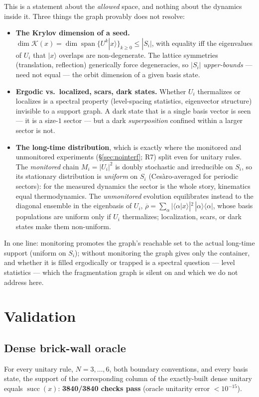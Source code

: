 \documentclass[11pt]{article}
\begin{document}
This is a statement about the \emph{allowed} space, and nothing about the dynamics
inside it. Three things the graph provably does not resolve:
\begin{itemize}\itemsep2pt
  \item \textbf{The Krylov dimension of a seed.}
  $\dim\mathcal K(x)=\dim\operatorname{span}\{U^k|x\rangle\}_{k\ge0}\le|S_i|$,
  with equality iff the eigenvalues of $U_i$ that $|x\rangle$ overlaps are
  non-degenerate. The lattice symmetries (translation, reflection) generically
  force degeneracies, so $|S_i|$ \emph{upper-bounds} --- need not equal --- the
  orbit dimension of a given basis state.
  \item \textbf{Ergodic vs.\ localized, scars, dark states.} Whether $U_i$
  thermalizes or localizes is a spectral property (level-spacing statistics,
  eigenvector structure) invisible to a support graph. A dark state that is a
  single basis vector is seen --- it is a size-$1$ sector --- but a dark
  \emph{superposition} confined within a larger sector is not.
  \item \textbf{The long-time distribution}, which is exactly where the monitored
  and unmonitored experiments (\S\ref{sec:nointerf}; R7) split even for unitary
  rules. The \emph{monitored} chain $M_i=|U_i|^2$ is doubly stochastic and
  irreducible on $S_i$, so its stationary distribution is \emph{uniform} on $S_i$
  (Ces\`aro-averaged for periodic sectors): for the measured dynamics the sector
  is the whole story, kinematics equal thermodynamics. The \emph{unmonitored}
  evolution equilibrates instead to the diagonal ensemble in the eigenbasis of
  $U_i$, $\overline\rho=\sum_\alpha|\langle\alpha|x\rangle|^2\,|\alpha\rangle\!
  \langle\alpha|$, whose basis populations are uniform only if $U_i$ thermalizes;
  localization, scars, or dark states make them non-uniform.
\end{itemize}
In one line: monitoring promotes the graph's reachable set to the actual
long-time support (uniform on $S_i$); without monitoring the graph gives only the
container, and whether it is filled ergodically or trapped is a spectral question
--- level statistics --- which the fragmentation graph is silent on and which we
do not address here.

\section{Validation}

\subsection{Dense brick-wall oracle}
For every unitary rule, $N=3,\dots,6$, both boundary conventions, and every basis
state, the support of the corresponding column of the exactly-built dense
unitary equals $\operatorname{succ}(x)$: \textbf{3840/3840 checks pass}
(oracle unitarity error $<10^{-15}$).
\end{document}

